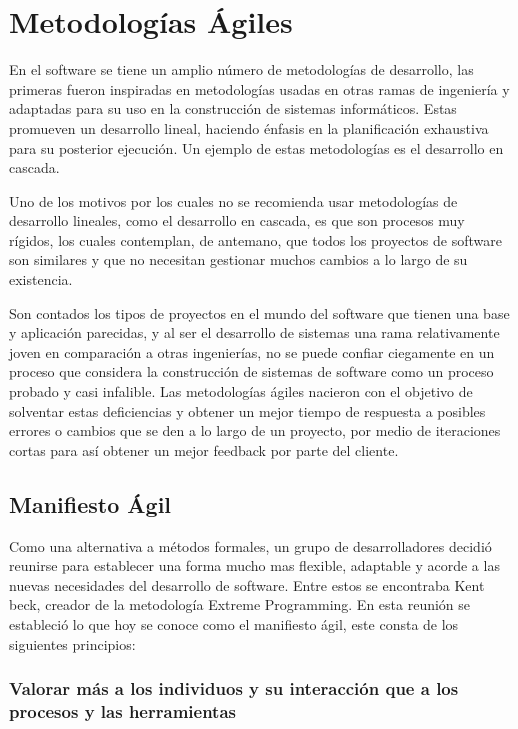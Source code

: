 \section{Metodologías Ágiles}

En el software se tiene un amplio número de metodologías de desarrollo, las
primeras fueron inspiradas en metodologías usadas en otras ramas de ingeniería
y adaptadas para su uso en la construcción de sistemas informáticos. Estas
promueven un desarrollo lineal, haciendo énfasis en la planificación exhaustiva
para su posterior ejecución. Un ejemplo de estas metodologías es el desarrollo
en cascada.

Uno de los motivos por los cuales no se recomienda usar metodologías de
desarrollo lineales, como el desarrollo en cascada, es que son procesos muy
rígidos,  los cuales  contemplan, de antemano, que todos los proyectos de
software son similares y que no necesitan gestionar muchos cambios a lo largo
de su existencia.

Son contados los tipos de proyectos en el mundo del software que tienen una
base y aplicación parecidas, y al ser el desarrollo de sistemas una rama
relativamente joven en comparación a otras ingenierías, no se puede confiar
ciegamente en un proceso que considera la construcción de sistemas de software
como un proceso probado y casi infalible. Las metodologías ágiles nacieron con
el objetivo de solventar estas deficiencias y obtener un mejor tiempo de
respuesta a posibles errores o cambios que se den a lo largo de un proyecto,
por medio de iteraciones cortas para así obtener un mejor feedback por parte
del cliente.

\subsection{Manifiesto Ágil}

Como una alternativa a métodos formales, un grupo de desarrolladores decidió
reunirse para establecer una forma mucho mas flexible, adaptable y
acorde a las nuevas necesidades del desarrollo de software. Entre estos
se encontraba Kent beck, creador de la metodología Extreme Programming.
En esta reunión se estableció lo que hoy se conoce como el manifiesto
ágil, este consta de los siguientes principios:

\subsubsection{Valorar más a los individuos y su interacción que a los procesos y las herramientas}

